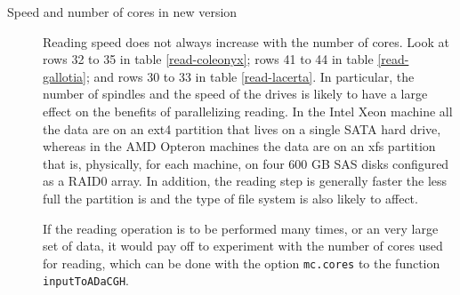 \documentclass[a4paper,11pt]{article}
\begin{document}
\begin{description}
\item[Speed and number of cores in new version] Reading speed does not
  always increase with the number of cores. Look at rows 32 to 35 in table
  \ref{read-coleonyx}; rows 41 to 44 in table \ref{read-gallotia}; and
  rows 30 to 33 in table \ref{read-lacerta}. In particular, the number of
  spindles and the speed of the drives is likely to have a large effect on
  the benefits of parallelizing reading. In the Intel Xeon machine all the
  data are on an ext4 partition that lives on a single SATA hard drive,
  whereas in the AMD Opteron machines the data are on an xfs partition
  that is, physically, for each machine, on four 600 GB SAS disks
  configured as a RAID0 array. In addition, the reading step is generally
  faster the less full the partition is and the type of file system is
  also likely to affect.

  If the reading operation is to be performed many times, or an very large
  set of data, it would pay off to experiment with the number of cores
  used for reading, which can be done with the option \texttt{mc.cores} to
  the function \texttt{inputToADaCGH}.

\end{description}
\end{document}
